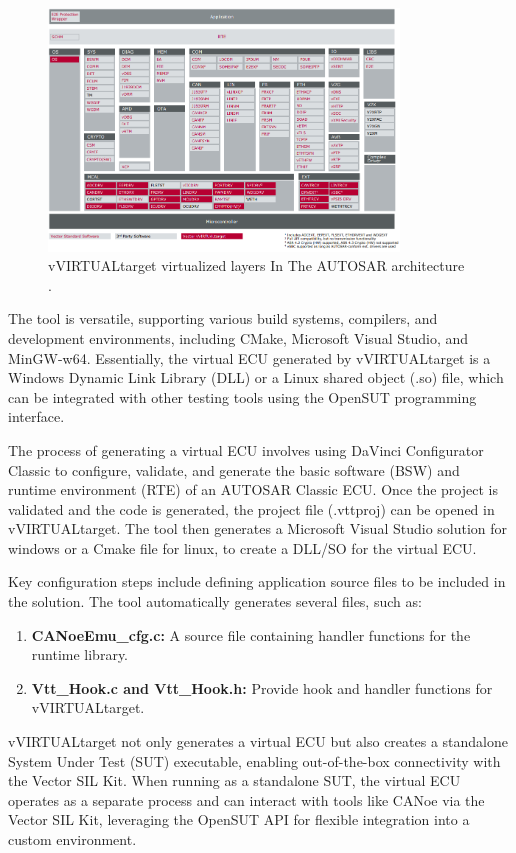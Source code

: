 \begin{figure}[htpb]
  \centering
  \includegraphics[width=0.83\textwidth]{figures/vVirtualTarget.PNG}
  \caption{vVIRTUALtarget virtualized layers In The 
AUTOSAR architecture \cite{user_man}.} \label{fig:vVirtualTarget}
\end{figure}

The tool is versatile, supporting various build systems, compilers, and development environments, including CMake, Microsoft Visual Studio, and MinGW-w64. Essentially, the virtual ECU generated by vVIRTUALtarget is a Windows Dynamic Link Library (DLL) or a Linux shared object (.so) file, which can be integrated with other testing tools using the OpenSUT programming interface.

The process of generating a virtual ECU involves using DaVinci Configurator Classic to configure, validate, and generate the basic software (BSW) and runtime environment (RTE) of an AUTOSAR Classic ECU. Once the project is validated and the code is generated, the project file (.vttproj) can be opened in vVIRTUALtarget. The tool then generates a Microsoft Visual Studio solution for windows or a Cmake file for linux, to create a DLL/SO for the virtual ECU.

Key configuration steps include defining application source files to be included in the solution. The tool automatically generates several files, such as:
\begin{enumerate}
\item \textbf{CANoeEmu\_cfg.c: } A source file containing handler functions for the runtime library.
\item \textbf{Vtt\_Hook.c and Vtt\_Hook.h: }Provide hook and handler functions for vVIRTUALtarget.
\end{enumerate}

vVIRTUALtarget not only generates a virtual ECU but also creates a standalone System Under Test (SUT) executable, enabling out-of-the-box connectivity with the Vector SIL Kit. When running as a standalone SUT, the virtual ECU operates as a separate process and can interact with tools like CANoe via the Vector SIL Kit, leveraging the OpenSUT API for flexible integration into a custom environment. \cite{user_man}

